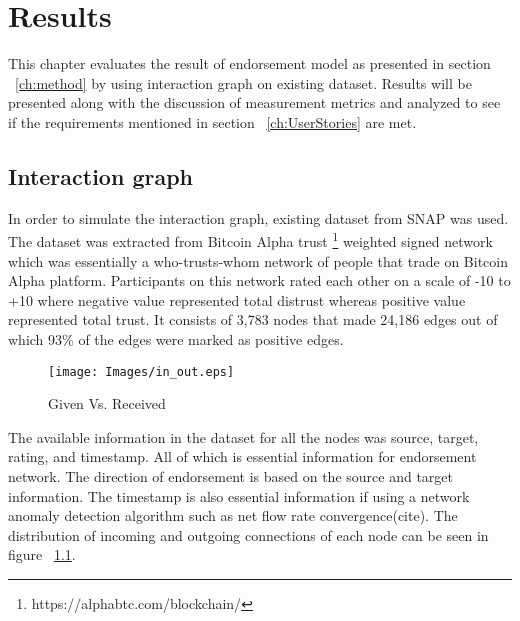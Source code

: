 \chapter{Results} \label{ch:results}
This chapter evaluates the result of endorsement model as presented in section
~\ref{ch:method} by using interaction graph on existing dataset. Results will
be presented along with the discussion of measurement metrics and analyzed to
see if the requirements mentioned in section ~\ref{ch:UserStories} are met.  

\section{Interaction graph}
In order to simulate the interaction graph, existing dataset from SNAP
\cite{snapnets} was used. The dataset was extracted from Bitcoin Alpha trust
\footnote{https://alphabtc.com/blockchain/}
weighted signed network which was essentially a who-trusts-whom network of
people that trade on Bitcoin Alpha platform. Participants on this network rated
each other on a scale of -10 to +10 where negative value represented total
distrust whereas positive value represented total trust. It consists of 3,783
nodes that made 24,186 edges out of which 93\% of the edges were marked as
positive edges\cite{kumar2016edge}. 

\begin{figure}[h]
	\texttt{[image: Images/in\_out.eps]}
	\caption{Given Vs. Received}
	\label{inOut}
\end{figure}

The available information in the dataset for all the nodes was source, target,
rating, and timestamp. All of which is essential information for endorsement
network. The direction of endorsement is based on the source and target
information. The timestamp is also essential information if using a network
anomaly detection algorithm such as net flow rate convergence(cite). The
distribution of incoming and outgoing connections of each node can be seen in
figure ~\ref{inOut}.










